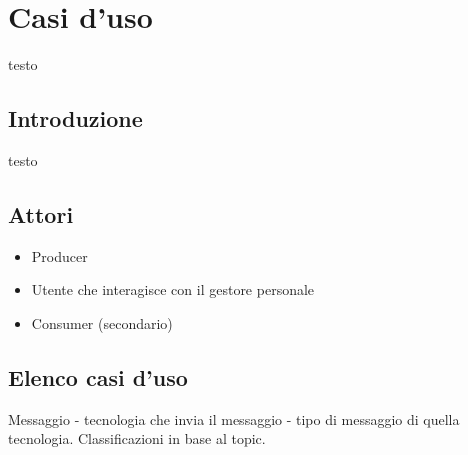 \newpage
\section{Casi d'uso}
testo

	\subsection{Introduzione}
	testo
	
	\subsection{Attori}
	\begin{itemize}
		\item Producer
		\item Utente che interagisce con il gestore personale
		\item Consumer (secondario)
	\end{itemize}
	
	\subsection{Elenco casi d'uso}
	Messaggio - tecnologia che invia il messaggio - tipo di messaggio di quella tecnologia.
	Classificazioni in base al topic.




